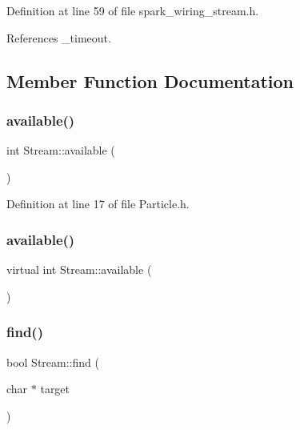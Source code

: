 Definition at line 59 of file spark\+\_\+wiring\+\_\+stream.\+h.



References \+\_\+timeout.



\subsection{Member Function Documentation}
\mbox{\label{class_stream_a747aa1d8db334a7b735a48dbc135478c}} 
\subsubsection{\texorpdfstring{available()}{available()}\hspace{0.1cm}{\footnotesize\ttfamily [1/2]}}
{\footnotesize\ttfamily int Stream\+::available (\begin{DoxyParamCaption}{ }\end{DoxyParamCaption})\hspace{0.3cm}{\ttfamily [inline]}}



Definition at line 17 of file Particle.\+h.

\mbox{\label{class_stream_a9c98a763395005c08ce95afb2f06c7b1}} 
\subsubsection{\texorpdfstring{available()}{available()}\hspace{0.1cm}{\footnotesize\ttfamily [2/2]}}
{\footnotesize\ttfamily virtual int Stream\+::available (\begin{DoxyParamCaption}{ }\end{DoxyParamCaption})\hspace{0.3cm}{\ttfamily [pure virtual]}}

\mbox{\label{class_stream_a4bab30ccd324efd461dee46a2339f673}} 
\subsubsection{\texorpdfstring{find()}{find()}\hspace{0.1cm}{\footnotesize\ttfamily [1/2]}}
{\footnotesize\ttfamily bool Stream\+::find (\begin{DoxyParamCaption}\item[{char $\ast$}]{target }\end{DoxyParamCaption})}

